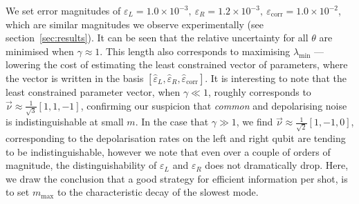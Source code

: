 We set error magnitudes of $\varepsilon_L = 1.0\times10^{-3},~\varepsilon_R = 1.2\times10^{-3},~\varepsilon_\mathrm{corr}=1.0\times10^{-2}$, which are similar magnitudes we observe experimentally (see section~\ref{sec:results}). It can be seen that the relative uncertainty for all $\theta$ are minimised when $\gamma\approx 1$. This length also corresponds to maximising $\lambda_\mathrm{min}$ --- lowering the cost of estimating the least constrained vector of parameters, where the vector is written in the basis $[\hat\varepsilon_L,\hat\varepsilon_R,\hat\varepsilon_\mathrm{corr}]$. It is interesting to note that the least constrained parameter vector, when $\gamma\ll 1$, roughly corresponds to $\vec\nu\approx\frac{1}{\sqrt{3}}[1,1,-1]$, confirming our suspicion that \emph{common} and depolarising noise is indistinguishable at small $m$. In the case that $\gamma\gg 1$, we find $\vec\nu\approx\frac{1}{\sqrt{2}}[1,-1,0]$, corresponding to the depolarisation rates on the left and right qubit are tending to be indistinguishable, however we note that even over a couple of orders of magnitude, the distinguishability of $\varepsilon_L$ and $\varepsilon_R$ does not dramatically drop. Here, we draw the conclusion that a good strategy for efficient information per shot, is to set $m_\mathrm{max}$ to the characteristic decay of the slowest mode.\\

